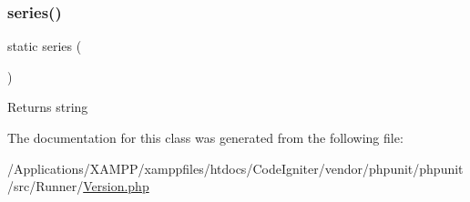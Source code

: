 \subsubsection{\texorpdfstring{series()}{series()}}
{\footnotesize\ttfamily static series (\begin{DoxyParamCaption}{ }\end{DoxyParamCaption})\hspace{0.3cm}{\ttfamily [static]}}

\begin{DoxyReturn}{Returns}
string 
\end{DoxyReturn}


The documentation for this class was generated from the following file\+:\begin{DoxyCompactItemize}
\item 
/\+Applications/\+X\+A\+M\+P\+P/xamppfiles/htdocs/\+Code\+Igniter/vendor/phpunit/phpunit/src/\+Runner/\mbox{\hyperlink{phpunit_2phpunit_2src_2_runner_2_version_8php}{Version.\+php}}\end{DoxyCompactItemize}
